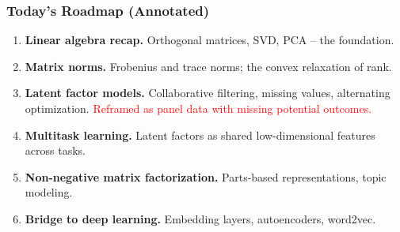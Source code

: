 \documentclass[notes,11pt, aspectratio=169]{beamer}
\begin{document}
\begin{frame}
\frametitle{Today's Roadmap (Annotated)}

\begin{enumerate}
    \item \textbf{Linear algebra recap.} Orthogonal matrices, SVD, PCA -- the foundation.
    \item \textbf{Matrix norms.} Frobenius and trace norms; the convex relaxation of rank.
    \item \textbf{Latent factor models.} Collaborative filtering, missing values, alternating optimization. \textcolor{red}{Reframed as panel data with missing potential outcomes.}
    \item \textbf{Multitask learning.} Latent factors as shared low-dimensional features across tasks.
    \item \textbf{Non-negative matrix factorization.} Parts-based representations, topic modeling.
    \item \textbf{Bridge to deep learning.} Embedding layers, autoencoders, word2vec.
\end{enumerate}
\end{frame}









\end{document}
